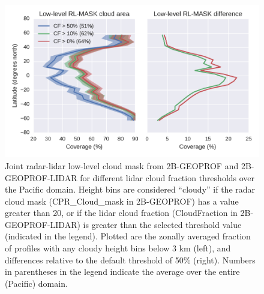 \begin{figure}[tp]
\centering
\includegraphics{graphics/misr_rlmask_test.pdf}
\caption{\label{fig:misr_rlmask_test}Joint radar-lidar low-level cloud
mask from 2B-GEOPROF and 2B-GEOPROF-LIDAR for different lidar cloud
fraction thresholds over the Pacific domain. Height bins are considered
``cloudy'' if the radar cloud mask (CPR\_Cloud\_mask in 2B-GEOPROF) has
a value greater than 20, or if the lidar cloud fraction (CloudFraction
in 2B-GEOPROF-LIDAR) is greater than the selected threshold value
(indicated in the legend). Plotted are the zonally averaged fraction of
profiles with any cloudy height bins below 3 km (left), and differences
relative to the default threshold of 50\% (right). Numbers in
parentheses in the legend indicate the average over the entire (Pacific)
domain.}\label{fig:misrux5frlmaskux5ftest}
\end{figure}

